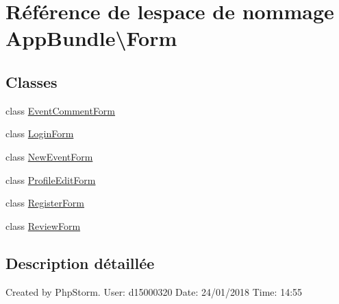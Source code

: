 \hypertarget{namespaceAppBundle_1_1Form}{}\section{Référence de l\textquotesingle{}espace de nommage App\+Bundle\textbackslash{}Form}
\label{namespaceAppBundle_1_1Form}
\subsection*{Classes}
\begin{DoxyCompactItemize}
\item 
class \hyperlink{classAppBundle_1_1Form_1_1EventCommentForm}{Event\+Comment\+Form}
\item 
class \hyperlink{classAppBundle_1_1Form_1_1LoginForm}{Login\+Form}
\item 
class \hyperlink{classAppBundle_1_1Form_1_1NewEventForm}{New\+Event\+Form}
\item 
class \hyperlink{classAppBundle_1_1Form_1_1ProfileEditForm}{Profile\+Edit\+Form}
\item 
class \hyperlink{classAppBundle_1_1Form_1_1RegisterForm}{Register\+Form}
\item 
class \hyperlink{classAppBundle_1_1Form_1_1ReviewForm}{Review\+Form}
\end{DoxyCompactItemize}


\subsection{Description détaillée}
Created by Php\+Storm. User\+: d15000320 Date\+: 24/01/2018 Time\+: 14\+:55 